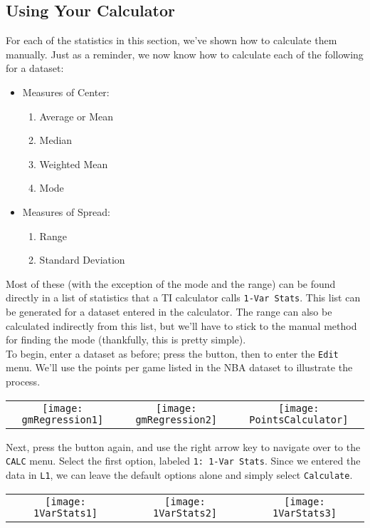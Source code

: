 \subsection{Using Your Calculator}
For each of the statistics in this section, we've shown how to calculate them manually.  Just as a reminder, we now know how to calculate each of the following for a dataset:
\begin{itemize}
\item Measures of Center:
\begin{enumerate}
\item Average or Mean
\item Median
\item Weighted Mean
\item Mode
\end{enumerate}
\item Measures of Spread:
\begin{enumerate}
\item Range
\item Standard Deviation
\end{enumerate}
\end{itemize}

Most of these (with the exception of the mode and the range) can be found directly in a list of statistics that a TI calculator calls \texttt{1-Var Stats}.  This list can be generated for a dataset entered in the calculator.  The range can also be calculated indirectly from this list, but we'll have to stick to the manual method for finding the mode (thankfully, this is pretty simple).\\

To begin, enter a dataset as before; press the  button, then  to enter the \texttt{Edit} menu.  We'll use the points per game listed in the NBA dataset to illustrate the process.
\begin{center}
\begin{tabular}{c c c}
\texttt{[image: gmRegression1]}
& \texttt{[image: gmRegression2]}
& \texttt{[image: PointsCalculator]}
\end{tabular}
\end{center}

Next, press the  button again, and use the right arrow key to navigate over to the \texttt{CALC} menu.  Select the first option, labeled \texttt{1: 1-Var Stats}.  Since we entered the data in \texttt{L1}, we can leave the default options alone and simply select \texttt{Calculate}.
\begin{center}
\begin{tabular}{c c c}
\texttt{[image: 1VarStats1]}
& \texttt{[image: 1VarStats2]}
& \texttt{[image: 1VarStats3]}
\end{tabular}
\end{center}

